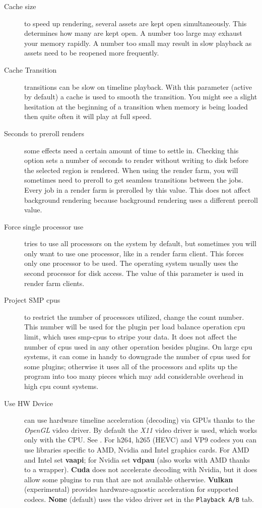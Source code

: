 \begin{description}
    \item[Cache size]  to speed up rendering, several assets are kept open simultaneously. This determines how many are kept open. A number too large may exhaust your memory rapidly. A number too small may result in slow playback as assets need to be reopened more frequently.
    \item[Cache Transition] transitions can be slow on timeline playback. With this parameter (active by default) a cache is used to smooth the transition. You might see a slight hesitation at the beginning of a transition when memory is being loaded then quite often it will play at full speed.
    \item[Seconds to preroll renders]  some effects need a certain amount of time to settle in. Checking this option sets a number of seconds to render without writing to disk before the selected region is rendered. When using the render farm, you will sometimes need to preroll to get seamless transitions between the     jobs. Every job in a render farm is prerolled by this value. This does not affect background rendering because background rendering uses a different preroll value.
    \item[Force single processor use]  \CGG{} tries to use all processors on the system by default, but sometimes you will only want to use one processor, like in a render farm client. This forces only one processor to be used.  The operating system usually uses the second processor for disk access. The value of this parameter is used in render farm clients.
    \item[Project SMP cpus]  to restrict the number of processors utilized, change the count number.  This number will be used for the plugin per load balance operation cpu limit, which uses smp-cpus to stripe your data. It does not affect the number of cpus used in any other \CGG{} operation besides plugins. On large cpu systems, it can come in handy to downgrade the number of cpus used for some plugins; otherwise it uses all of the processors and splits up the program into too many pieces which may add considerable overhead in high cpu count systems.
    \item[Use HW Device]  \CGG{} can use hardware timeline acceleration (decoding) via GPUs thanks to the \textit{OpenGL} video driver. By default the \textit{X11} video driver is used, which works only with the CPU. See . For h264, h265 (HEVC) and VP9 codecs you can use libraries specific to AMD, Nvidia and Intel graphics cards. For AMD and Intel set \textbf{vaapi}; for Nvidia set \textbf{vdpau} (also works with AMD thanks to a wrapper). \textbf{Cuda} does not accelerate decoding with Nvidia, but it does allow some plugins to run that are not available otherwise. \textbf{Vulkan} (experimental) provides hardware-agnostic acceleration for supported codecs. \textbf{None} (default) uses the video driver set in the \texttt{Playback A/B} tab.
\end{description}

